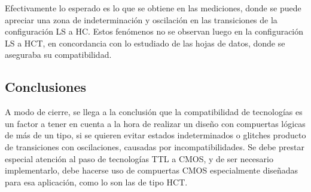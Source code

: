 Efectivamente lo esperado es lo que se obtiene en las mediciones, donde se puede apreciar una zona de indeterminación y oscilación en las transiciones de la configuración 
LS a HC.
Estos fenómenos no se observan luego en la configuración LS a HCT, en concordancia con lo estudiado de las hojas de datos, donde se aseguraba su compatibilidad.



\subsection{Conclusiones}
A modo de cierre, se llega a la conclusión que la compatibilidad de tecnologías es un factor a tener en cuenta a la hora de realizar un diseño con compuertas lógicas de 
más de un tipo, si se quieren evitar estados indeterminados o glitches producto de transiciones con oscilaciones, causadas por incompatibilidades.
Se debe prestar especial atención al paso de tecnologías TTL a CMOS, y de ser necesario implementarlo, debe hacerse uso de compuertas CMOS especialmente diseñadas para 
esa aplicación, como lo son las de tipo HCT.